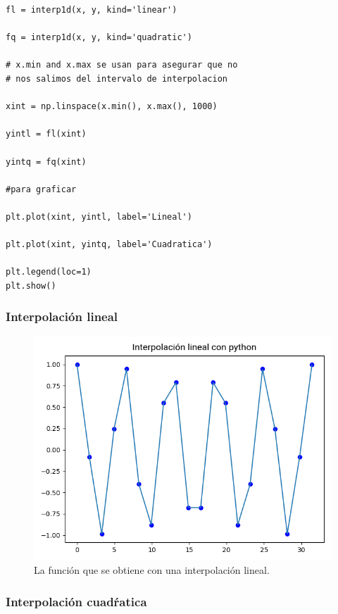 {\begin{frame}
\begin{lstlisting}[caption=Cambiando el tipo de interpolación, style= FormattedNumber, basicstyle=\linespread{0.9}\ttfamily=\small, columns=fullflexible]
fl = interp1d(x, y, kind='linear')

fq = interp1d(x, y, kind='quadratic')

# x.min and x.max se usan para asegurar que no
# nos salimos del intervalo de interpolacion

xint = np.linspace(x.min(), x.max(), 1000)

yintl = fl(xint)

yintq = fq(xint)

#para graficar

plt.plot(xint, yintl, label='Lineal')

plt.plot(xint, yintq, label='Cuadratica')

plt.legend(loc=1)
plt.show()
\end{lstlisting}
\end{frame}
\begin{frame}
\frametitle{Interpolación lineal}
\begin{figure}
\hspace*{-0.2cm}\includegraphics[scale=0.5]{Imagenes/interpolacion_02}
\caption{La función que se obtiene con una interpolación lineal.}
\end{figure}
\end{frame}
\begin{frame}
\frametitle{Interpolación cuadŕatica}
\begin{figure}

\end{figure}
\end{frame}}
